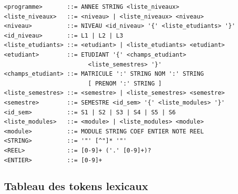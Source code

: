 \documentclass[10pt,a4paper]{article}
\begin{document}
\begin{tcolorbox}[codebox, title={Grammaire BNF du langage .sgn}]
\begin{lstlisting}[numbers=none,frame=none,backgroundcolor=\color{white}]
<programme>       ::= ANNEE STRING <liste_niveaux>
<liste_niveaux>   ::= <niveau> | <liste_niveaux> <niveau>
<niveau>          ::= NIVEAU <id_niveau> '{' <liste_etudiants> '}'
<id_niveau>       ::= L1 | L2 | L3
<liste_etudiants> ::= <etudiant> | <liste_etudiants> <etudiant>
<etudiant>        ::= ETUDIANT '{' <champs_etudiant>
                        <liste_semestres> '}'
<champs_etudiant> ::= MATRICULE ':' STRING NOM ':' STRING
                        [ PRENOM ':' STRING ]
<liste_semestres> ::= <semestre> | <liste_semestres> <semestre>
<semestre>        ::= SEMESTRE <id_sem> '{' <liste_modules> '}'
<id_sem>          ::= S1 | S2 | S3 | S4 | S5 | S6
<liste_modules>   ::= <module> | <liste_modules> <module>
<module>          ::= MODULE STRING COEF ENTIER NOTE REEL
<STRING>          ::= '"' [^"]* '"'
<REEL>            ::= [0-9]+ ('.' [0-9]+)?
<ENTIER>          ::= [0-9]+
\end{lstlisting}
\end{tcolorbox}

\subsection{Tableau des tokens lexicaux}
\end{document}
